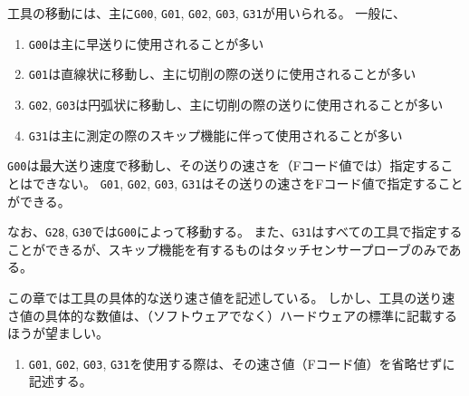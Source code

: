 


工具の移動には、主に\verb|G00|, \verb|G01|, \verb|G02|, \verb|G03|, \verb|G31|が用いられる。
一般に、
\begin{enumerate}
\item \verb|G00|は主に早送りに使用されることが多い
\item \verb|G01|は直線状に移動し、主に切削の際の送りに使用されることが多い
\item \verb|G02|, \verb|G03|は円弧状に移動し、主に切削の際の送りに使用されることが多い
\item \verb|G31|は主に測定の際のスキップ機能に伴って使用されることが多い
\end{enumerate}
\verb|G00|は最大送り速度で移動し、その送りの速さを（Fコード値では）指定することはできない。
\verb|G01|, \verb|G02|, \verb|G03|, \verb|G31|はその送りの速さをFコード値で指定することができる。

なお、\verb|G28|, \verb|G30|では\verb|G00|によって移動する。
また、\verb|G31|はすべての工具で指定することができるが、スキップ機能を有するものはタッチセンサープローブのみである。
\begin{hosoku}
この章では工具の具体的な送り速さ値を記述している。
しかし、工具の送り速さ値の具体的な数値は、（ソフトウェアでなく）ハードウェアの標準に記載するほうが望ましい。
\end{hosoku}


\begin{enumerate}
\item \verb|G01|, \verb|G02|, \verb|G03|, \verb|G31|を使用する際は、その速さ値（Fコード値）を省略せずに記述する。
\end{enumerate}

